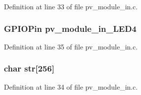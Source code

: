 Definition at line 33 of file pv\+\_\+module\+\_\+in.\+c.

\subsubsection[{\texorpdfstring{pv\+\_\+module\+\_\+in\+\_\+\+L\+E\+D4}{pv_module_in_LED4}}]{\setlength{\rightskip}{0pt plus 5cm}G\+P\+I\+O\+Pin pv\+\_\+module\+\_\+in\+\_\+\+L\+E\+D4}\hypertarget{group__app__in_ga8d3f5e0ec53e4667efbebf11383765e4}{}\label{group__app__in_ga8d3f5e0ec53e4667efbebf11383765e4}


Definition at line 35 of file pv\+\_\+module\+\_\+in.\+c.

\subsubsection[{\texorpdfstring{str}{str}}]{\setlength{\rightskip}{0pt plus 5cm}char str\mbox{[}256\mbox{]}}\hypertarget{group__app__in_ga3000f858ecb5a5417c1566b691efd56d}{}\label{group__app__in_ga3000f858ecb5a5417c1566b691efd56d}


Definition at line 34 of file pv\+\_\+module\+\_\+in.\+c.


